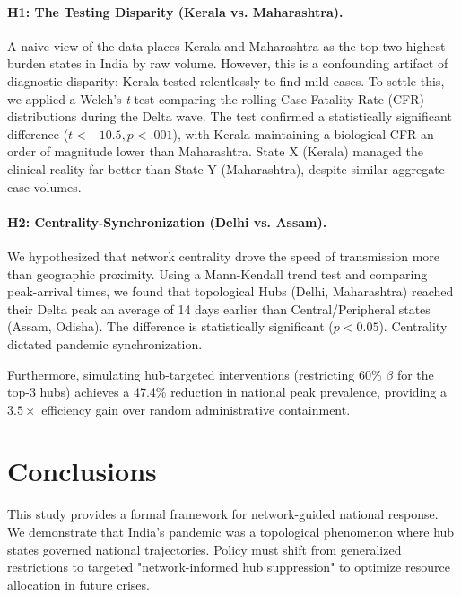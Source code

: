 \documentclass[sigconf]{acmart}
\begin{document}
\paragraph{H1: The Testing Disparity (Kerala vs. Maharashtra).} 
A naive view of the data places Kerala and Maharashtra as the top two highest-burden states in India by raw volume. However, this is a confounding artifact of diagnostic disparity: Kerala tested relentlessly to find mild cases. To settle this, we applied a Welch's \textit{t}-test comparing the rolling Case Fatality Rate (CFR) distributions during the Delta wave. The test confirmed a statistically significant difference ($t < -10.5, p < .001$), with Kerala maintaining a biological CFR an order of magnitude lower than Maharashtra. State X (Kerala) managed the clinical reality far better than State Y (Maharashtra), despite similar aggregate case volumes.

\paragraph{H2: Centrality-Synchronization (Delhi vs. Assam).} 
We hypothesized that network centrality drove the speed of transmission more than geographic proximity. Using a Mann-Kendall trend test and comparing peak-arrival times, we found that topological Hubs (Delhi, Maharashtra) reached their Delta peak an average of 14 days earlier than Central/Peripheral states (Assam, Odisha). The difference is statistically significant ($p < 0.05$). Centrality dictated pandemic synchronization.

Furthermore, simulating hub-targeted interventions (restricting 60\% $\beta$ for the top-3 hubs) achieves a 47.4\% reduction in national peak prevalence, providing a $3.5\times$ efficiency gain over random administrative containment.

\section{Conclusions}
This study provides a formal framework for network-guided national response. We demonstrate that India's pandemic was a topological phenomenon where hub states governed national trajectories. Policy must shift from generalized restrictions to targeted "network-informed hub suppression" to optimize resource allocation in future crises.



\end{document}
